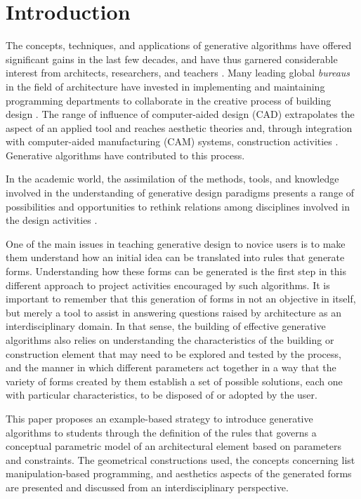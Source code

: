 \documentclass[preprint,12pt,3p]{elsarticle}
\begin{document}
\section{Introduction}
\label{sec1}

The concepts, techniques, and applications of generative algorithms have offered significant gains in the last few decades, and have thus garnered considerable interest from architects, researchers, and teachers \cite{krish2011}. Many leading global \textit{bureaus} in the field of architecture have invested in implementing and maintaining programming departments to collaborate in the creative process of building design \cite{ceccato2010mbg}. The range of influence of computer-aided design (CAD) extrapolates the aspect of an applied tool and reaches aesthetic theories \cite{Oxman2006} \cite{picon2011} and, through integration with computer-aided manufacturing (CAM) systems, construction activities \cite{kolarevic2003}. Generative algorithms have contributed to this process.

In the academic world, the assimilation of the methods, tools, and knowledge involved in the understanding of generative design paradigms presents a range of possibilities and opportunities to rethink relations among disciplines involved in the design activities \cite{kolarevic2003} \cite{aag2010113}.

One of the main issues in teaching generative design to novice users is to make them understand how an initial idea can be translated into rules that generate forms. Understanding how these forms can be generated is the first step in this different approach to project activities encouraged by such algorithms. It is important to remember that this generation of forms in not an objective in itself, but merely a tool to assist in answering questions raised by architecture as an interdisciplinary domain. In that sense, the building of effective generative algorithms also relies on understanding the characteristics of the building or construction element that may need to be explored and tested by the process, and the manner in which different parameters act together in a way that the variety of forms created by them establish a set of possible solutions, each one with particular characteristics, to be disposed of or adopted by the user.

This paper proposes an example-based strategy to introduce generative algorithms to students through the definition of the rules that governs a conceptual parametric model of an architectural element based on parameters and constraints. The geometrical constructions used, the concepts concerning list manipulation-based programming, and aesthetics aspects of the generated forms are presented and discussed from an interdisciplinary perspective.
\end{document}
